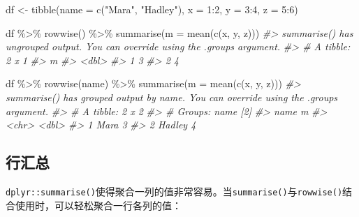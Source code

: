 \documentclass[
]{book}
\newenvironment{Shaded}{\begin{snugshade}}{\end{snugshade}}
\newcommand{\AttributeTok}[1]{\textcolor[rgb]{0.77,0.63,0.00}{#1}}
\newcommand{\CommentTok}[1]{\textcolor[rgb]{0.56,0.35,0.01}{\textit{#1}}}
\newcommand{\DecValTok}[1]{\textcolor[rgb]{0.00,0.00,0.81}{#1}}
\newcommand{\FunctionTok}[1]{\textcolor[rgb]{0.00,0.00,0.00}{#1}}
\newcommand{\NormalTok}[1]{#1}
\newcommand{\OtherTok}[1]{\textcolor[rgb]{0.56,0.35,0.01}{#1}}
\newcommand{\SpecialCharTok}[1]{\textcolor[rgb]{0.00,0.00,0.00}{#1}}
\newcommand{\StringTok}[1]{\textcolor[rgb]{0.31,0.60,0.02}{#1}}
\begin{document}
\begin{Shaded}
\begin{Highlighting}[]
\NormalTok{df }\OtherTok{\textless{}{-}} \FunctionTok{tibble}\NormalTok{(}\AttributeTok{name =} \FunctionTok{c}\NormalTok{(}\StringTok{"Mara"}\NormalTok{, }\StringTok{"Hadley"}\NormalTok{), }\AttributeTok{x =} \DecValTok{1}\SpecialCharTok{:}\DecValTok{2}\NormalTok{, }\AttributeTok{y =} \DecValTok{3}\SpecialCharTok{:}\DecValTok{4}\NormalTok{, }\AttributeTok{z =} \DecValTok{5}\SpecialCharTok{:}\DecValTok{6}\NormalTok{)}

\NormalTok{df }\SpecialCharTok{\%\textgreater{}\%} 
  \FunctionTok{rowwise}\NormalTok{() }\SpecialCharTok{\%\textgreater{}\%} 
  \FunctionTok{summarise}\NormalTok{(}\AttributeTok{m =} \FunctionTok{mean}\NormalTok{(}\FunctionTok{c}\NormalTok{(x, y, z)))}
\CommentTok{\#\textgreater{} \textasciigrave{}summarise()\textasciigrave{} has ungrouped output. You can override using the \textasciigrave{}.groups\textasciigrave{} argument.}
\CommentTok{\#\textgreater{} \# A tibble: 2 x 1}
\CommentTok{\#\textgreater{}       m}
\CommentTok{\#\textgreater{}   \textless{}dbl\textgreater{}}
\CommentTok{\#\textgreater{} 1     3}
\CommentTok{\#\textgreater{} 2     4}

\NormalTok{df }\SpecialCharTok{\%\textgreater{}\%} 
  \FunctionTok{rowwise}\NormalTok{(name) }\SpecialCharTok{\%\textgreater{}\%} 
  \FunctionTok{summarise}\NormalTok{(}\AttributeTok{m =} \FunctionTok{mean}\NormalTok{(}\FunctionTok{c}\NormalTok{(x, y, z)))}
\CommentTok{\#\textgreater{} \textasciigrave{}summarise()\textasciigrave{} has grouped output by \textquotesingle{}name\textquotesingle{}. You can override using the \textasciigrave{}.groups\textasciigrave{} argument.}
\CommentTok{\#\textgreater{} \# A tibble: 2 x 2}
\CommentTok{\#\textgreater{} \# Groups:   name [2]}
\CommentTok{\#\textgreater{}   name       m}
\CommentTok{\#\textgreater{}   \textless{}chr\textgreater{}  \textless{}dbl\textgreater{}}
\CommentTok{\#\textgreater{} 1 Mara       3}
\CommentTok{\#\textgreater{} 2 Hadley     4}
\end{Highlighting}
\end{Shaded}

\hypertarget{ux884cux6c47ux603b}{%
\subsection{行汇总}\label{ux884cux6c47ux603b}}

\texttt{dplyr::summarise()}使得聚合一列的值非常容易。当\texttt{summarise()}与\texttt{rowwise()}结合使用时，可以轻松聚合一行各列的值：
\end{document}
